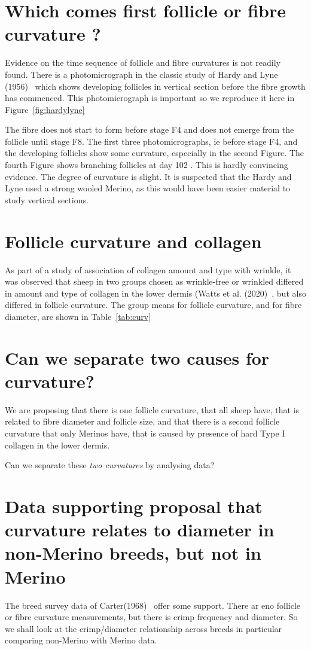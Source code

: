 \documentclass{article}
\begin{document}
\section{Which comes first follicle or fibre curvature ?}
Evidence on the time sequence of follicle and fibre curvatures is not readily found. There is a photomicrograph in the classic study of Hardy and Lyne (1956)~\cite{hardy-1956} which shows developing follicles in vertical section before the fibre growth has commenced. This photomicrograph is important so we reproduce it here in Figure~\ref{fig:hardylyne}

The fibre does not start to form before stage F4 and does not emerge from the follicle until stage F8. The first three photomicrographs, ie before stage F4, and the developing follicles show some curvature, especially in the second Figure. The fourth Figure shows branching follicles at day 102 .
This is hardly convincing evidence. The degree of curvature is slight. It is suspected that the Hardy and Lyne used a strong wooled Merino, as this would have been easier material to study vertical sections. 

\section{Follicle curvature and collagen}
As part of a study of association of collagen amount and type with wrinkle, it was observed that sheep in two groups chosen as wrinkle-free or wrinkled differed in amount and type of collagen in the lower dermis (Watts et al. (2020)~\cite{watts-2020}, but also differed in follicle curvature.  The group means for follicle curvature, and for fibre diameter, are shown in Table~\ref{tab:curv}


\section{Can we separate two causes for curvature?}
We are proposing that there is one follicle curvature, that all sheep have, that is related to fibre diameter and follicle size, and that there is a second follicle curvature that only Merinos have, that is caused by  presence of hard Type I collagen in the lower dermis.

Can we separate these {\em two curvatures} by analysing data? 

\section{Data supporting proposal that curvature relates to diameter in non-Merino breeds, but not in Merino}
The breed survey data of Carter(1968)~\cite{carter-1968} offer some support. There ar eno follicle or fibre curvature measurements, but there is crimp frequency and diameter. So we shall look at the crimp/diameter relationship  across breeds in particular comparing non-Merino with Merino data.
\end{document}
